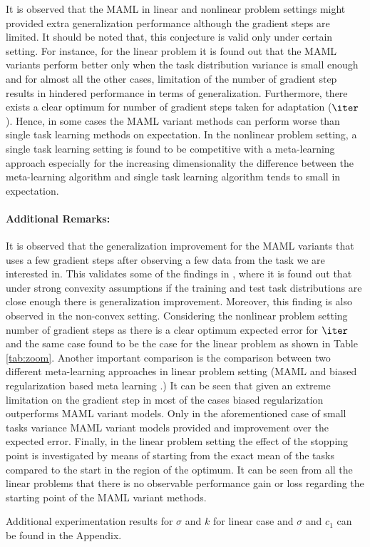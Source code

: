 It is observed that the MAML in linear and nonlinear problem settings might provided extra generalization performance although the gradient steps are limited. It should be noted that, this conjecture is valid only under certain setting. For instance, for the linear problem it is found out that the MAML variants perform better only when the task distribution variance is small enough and for almost all the other cases, limitation of the number of gradient step results in hindered performance in terms of generalization. Furthermore, there exists a clear optimum for number of gradient steps taken for adaptation ($\iter$). Hence, in some cases the MAML variant methods can perform worse than single task learning methods on expectation. In the nonlinear problem setting, a single task learning setting is found to be competitive with a meta-learning approach especially for the increasing dimensionality the difference between the meta-learning algorithm and single task learning algorithm tends to small in expectation.

\paragraph{Additional Remarks:} It is observed that the generalization improvement for the MAML variants that uses a few gradient steps after observing a few data from the task we are interested in. This validates some of the findings in \cite{Fallah2021}, where it is found out that under strong convexity assumptions if the training and test task distributions are close enough there is generalization improvement. Moreover, this finding is also observed in the non-convex setting. Considering the nonlinear problem setting number of gradient steps as there is a clear optimum expected error for $\iter$ and the same case found to be the case for the linear problem as shown in Table \ref{tab:zoom}. Another important comparison is the comparison between two different meta-learning approaches in linear problem setting (MAML \cite{Finn2017} and biased regularization based meta learning \cite{Denevi2018}.) It can be seen that given an extreme limitation on the gradient step in most of the cases biased regularization outperforms MAML variant models. Only in the aforementioned case of small tasks variance MAML variant models provided and improvement over the expected error. Finally, in the linear problem setting the effect of the stopping point is investigated by means of starting from the exact mean of the tasks compared to the start in the region of the optimum. It can be seen from all the linear problems that there is no observable performance gain or loss regarding the starting point of the MAML variant methods. 


Additional experimentation results for $\sigma$ and $k$ for linear case and $\sigma$ and $c_1$ can be found in the Appendix.
